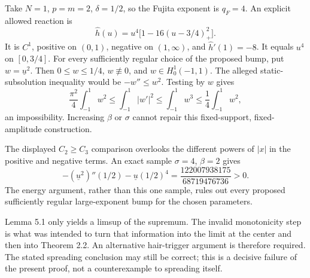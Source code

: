 \documentclass[10pt]{article}
\begin{document}
Take \(N=1\), \(p=m=2\), \(\delta=1/2\), so the Fujita exponent is \(q_F=4\). An explicit allowed reaction is \[\widehat h(u)=u^4\bigl[1-16(u-3/4)_+^2\bigr].\] It is \(C^1\), positive on \((0,1)\), negative on \((1,\infty)\), and \(\widehat h'(1)=-8\). It equals \(u^4\) on \([0,3/4]\). For every sufficiently regular choice of the proposed bump, put \(w=\underline u^2\). Then \(0\leq w\leq1/4\), \(w\not\equiv0\), and \(w\in H^1_0(-1,1)\). The alleged static-subsolution inequality would be \(-w''\leq w^2\). Testing by \(w\) gives \[\frac{\pi^2}{4}\int_{-1}^1w^2
 \leq\int_{-1}^1|w'|^2
 \leq\int_{-1}^1w^3
 \leq\frac14\int_{-1}^1w^2,\] an impossibility. Increasing \(\beta\) or \(\sigma\) cannot repair this fixed-support, fixed-amplitude construction.\par
The displayed \(C_2\geq C_3\) comparison overlooks the different powers of \(|x|\) in the positive and negative terms. An exact sample \(\sigma=4\), \(\beta=2\) gives \[-(\underline u^2)''(1/2)-\underline u(1/2)^4
 =\frac{122007938175}{68719476736}>0.\] The energy argument, rather than this one sample, rules out every proposed sufficiently regular large-exponent bump for the chosen parameters.\par
Lemma 5.1 only yields a limsup of the supremum. The invalid monotonicity step is what was intended to turn that information into the limit at the center and then into Theorem 2.2. An alternative hair-trigger argument is therefore required. The stated spreading conclusion may still be correct; this is a decisive failure of the present proof, not a counterexample to spreading itself.\par
\end{document}
